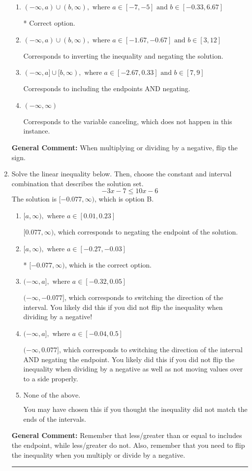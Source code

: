 \documentclass{extbook}[14pt]
\newcommand{\litem}[1]{\item #1

\rule{\textwidth}{0.4pt}}
\begin{document}
\begin{enumerate}
{\begin{enumerate}[label=\Alph*.]
Corresponds to including the endpoints (when they should be excluded).
\item \( (-\infty, a) \cup (b, \infty), \text{ where } a \in [-7, -5] \text{ and } b \in [-0.33, 6.67] \)

 * Correct option.
\item \( (-\infty, a) \cup (b, \infty), \text{ where } a \in [-1.67, -0.67] \text{ and } b \in [3, 12] \)

Corresponds to inverting the inequality and negating the solution.
\item \( (-\infty, a] \cup [b, \infty), \text{ where } a \in [-2.67, 0.33] \text{ and } b \in [7, 9] \)

Corresponds to including the endpoints AND negating.
\item \( (-\infty, \infty) \)

Corresponds to the variable canceling, which does not happen in this instance.
\end{enumerate}

\textbf{General Comment:} When multiplying or dividing by a negative, flip the sign.
}
\litem{
Solve the linear inequality below. Then, choose the constant and interval combination that describes the solution set.
\[ -3x -7 \leq 10x -6 \]The solution is \( [-0.077, \infty) \), which is option B.\begin{enumerate}[label=\Alph*.]
\item \( [a, \infty), \text{ where } a \in [0.01, 0.23] \)

 $[0.077, \infty)$, which corresponds to negating the endpoint of the solution.
\item \( [a, \infty), \text{ where } a \in [-0.27, -0.03] \)

* $[-0.077, \infty)$, which is the correct option.
\item \( (-\infty, a], \text{ where } a \in [-0.32, 0.05] \)

 $(-\infty, -0.077]$, which corresponds to switching the direction of the interval. You likely did this if you did not flip the inequality when dividing by a negative!
\item \( (-\infty, a], \text{ where } a \in [-0.04, 0.5] \)

 $(-\infty, 0.077]$, which corresponds to switching the direction of the interval AND negating the endpoint. You likely did this if you did not flip the inequality when dividing by a negative as well as not moving values over to a side properly.
\item \( \text{None of the above}. \)

You may have chosen this if you thought the inequality did not match the ends of the intervals.
\end{enumerate}

\textbf{General Comment:} Remember that less/greater than or equal to includes the endpoint, while less/greater do not. Also, remember that you need to flip the inequality when you multiply or divide by a negative.
}
\end{enumerate}
\end{document}
